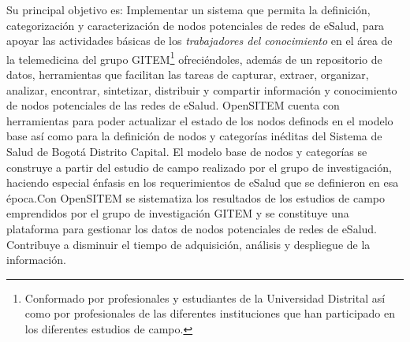 Su principal objetivo es: Implementar un sistema que permita la definición, categorización y caracterización de nodos potenciales de redes de eSalud, para apoyar las actividades básicas de los \textit{trabajadores del conocimiento} en el área de la telemedicina del grupo GITEM\footnote{Conformado por profesionales y estudiantes de la Universidad Distrital así como por profesionales de las diferentes instituciones que han participado en los diferentes estudios de campo.}  ofreciéndoles, además de un repositorio de datos, herramientas que facilitan las tareas de capturar, extraer, organizar, analizar, encontrar, sintetizar, distribuir y compartir información y conocimiento de nodos potenciales de las redes de eSalud. OpenSITEM cuenta con herramientas para poder  actualizar el estado de los nodos definods en el modelo base así como para la definición de nodos y categorías inéditas del Sistema de Salud de Bogotá Distrito Capital. El modelo base de nodos y categorías se construye a partir del estudio de campo realizado por el grupo de investigación, haciendo especial énfasis en los requerimientos de eSalud que se definieron en esa época.Con OpenSITEM se sistematiza los resultados de los estudios de campo emprendidos por el grupo de investigación GITEM y se constituye una plataforma para gestionar los datos de nodos potenciales de redes de eSalud. Contribuye a disminuir el tiempo de adquisición, análisis y despliegue de la información.  

